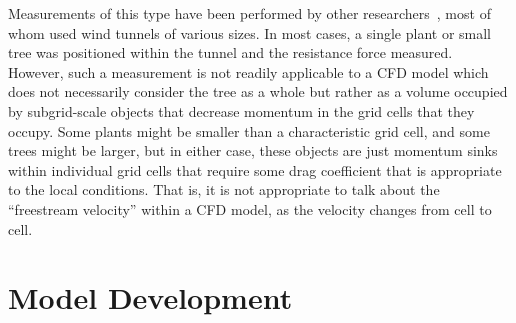 \documentclass[12pt]{article}
\begin{document}
Measurements of this type have been performed by other researchers~\cite{Cao2012,Jalonen2014,Mayhead1973,Gillies2002,Ishikawa2006}, most of whom used wind tunnels of various sizes. In most cases, a single plant or small tree was positioned within the tunnel and the resistance force measured. However, such a measurement is not readily applicable to a CFD model which does not necessarily consider the tree as a whole but rather as a volume occupied by subgrid-scale objects that decrease momentum in the grid cells that they occupy. Some plants might be smaller than a characteristic grid cell, and some trees might be larger, but in either case, these objects are just momentum sinks within individual grid cells that require some drag coefficient that is appropriate to the local conditions. That is, it is not appropriate to talk about the ``freestream velocity'' within a CFD model, as the velocity changes from cell to cell.


\section{Model Development}
\label{ssec:headingscap}
\end{document}
